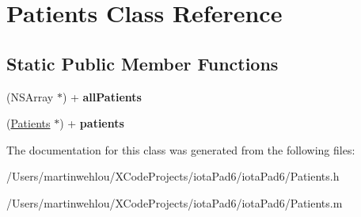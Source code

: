 \hypertarget{interface_patients}{
\section{Patients Class Reference}
\label{interface_patients}
}
\subsection*{Static Public Member Functions}
\begin{DoxyCompactItemize}
\item 
\hypertarget{interface_patients_a958afbb25dd5b8c7497131ff3be27d72}{
(NSArray $\ast$) + {\bfseries allPatients}}
\label{interface_patients_a958afbb25dd5b8c7497131ff3be27d72}

\item 
\hypertarget{interface_patients_a792bc9698b400ebd97a285cfb0a4169c}{
(\hyperlink{interface_patients}{Patients} $\ast$) + {\bfseries patients}}
\label{interface_patients_a792bc9698b400ebd97a285cfb0a4169c}

\end{DoxyCompactItemize}


The documentation for this class was generated from the following files:\begin{DoxyCompactItemize}
\item 
/Users/martinwehlou/XCodeProjects/iotaPad6/iotaPad6/Patients.h\item 
/Users/martinwehlou/XCodeProjects/iotaPad6/iotaPad6/Patients.m\end{DoxyCompactItemize}
